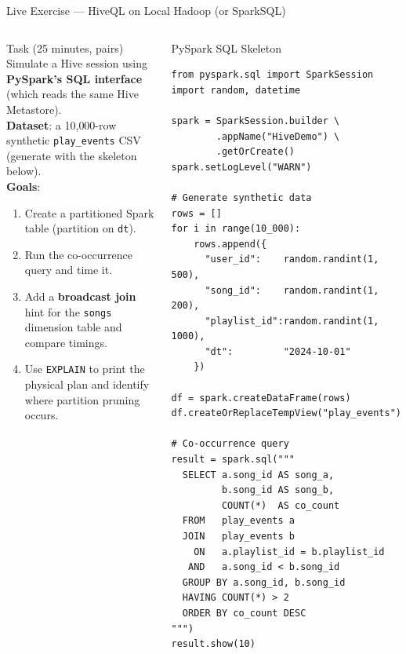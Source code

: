 \documentclass[aspectratio=169,10pt]{beamer}
\begin{document}
\begin{frame}[fragile]{Live Exercise — HiveQL on Local Hadoop (or SparkSQL)}
  \begin{columns}[T]
      \begin{block}{Task (25 minutes, pairs)}
        Simulate a Hive session using \textbf{PySpark's SQL interface}
        (which reads the same Hive Metastore).\\[5pt]
        \textbf{Dataset}: a 10{,}000-row synthetic \texttt{play\_events}
        CSV (generate with the skeleton below).\\[5pt]
        \textbf{Goals}:
        \begin{enumerate}\setlength\itemsep{1pt}
          \item Create a partitioned Spark table
                (partition on \texttt{dt}).
          \item Run the co-occurrence query and time it.
          \item Add a \textbf{broadcast join} hint for the
                \texttt{songs} dimension table and compare timings.
          \item Use \texttt{EXPLAIN} to print the physical plan
                and identify where partition pruning occurs.
        \end{enumerate}
      \end{block}

      \begin{exampleblock}{PySpark SQL Skeleton}
        \scriptsize
        \begin{verbatim}
from pyspark.sql import SparkSession
import random, datetime

spark = SparkSession.builder \
        .appName("HiveDemo") \
        .getOrCreate()
spark.setLogLevel("WARN")

# Generate synthetic data
rows = []
for i in range(10_000):
    rows.append({
      "user_id":    random.randint(1, 500),
      "song_id":    random.randint(1, 200),
      "playlist_id":random.randint(1, 1000),
      "dt":         "2024-10-01"
    })

df = spark.createDataFrame(rows)
df.createOrReplaceTempView("play_events")

# Co-occurrence query
result = spark.sql("""
  SELECT a.song_id AS song_a,
         b.song_id AS song_b,
         COUNT(*)  AS co_count
  FROM   play_events a
  JOIN   play_events b
    ON   a.playlist_id = b.playlist_id
   AND   a.song_id < b.song_id
  GROUP BY a.song_id, b.song_id
  HAVING COUNT(*) > 2
  ORDER BY co_count DESC
""")
result.show(10)
        \end{verbatim}
      \end{exampleblock}
  \end{columns}
\end{frame}
\end{document}
